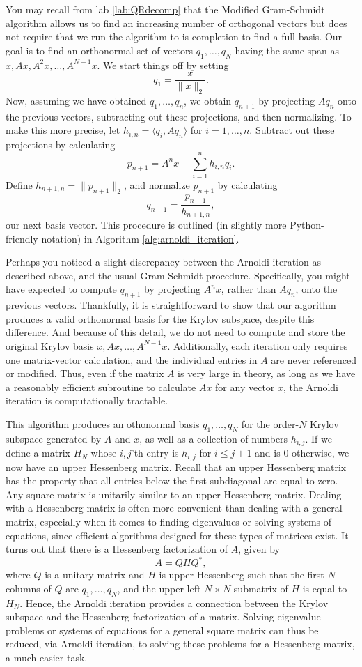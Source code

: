 You may recall from lab \ref{lab:QRdecomp} that the Modified Gram-Schmidt algorithm allows us to find an increasing number of orthogonal
vectors but does not require that we run the algorithm to is completion to find a full basis.
Our goal is to find an orthonormal set of vectors $q_1,\ldots,q_N$ having the same span as $x, Ax, A^2x, \ldots, A^{N-1} x$.
We start
 things off by setting
\[
q_1 = \frac{x}{\|x\|_2}.
\]
Now, assuming we have obtained $q_1,\ldots,q_n$, we obtain $q_{n+1}$ by projecting $A q_n$ onto the previous vectors,
subtracting out these projections, and then normalizing. To make this more precise, let $h_{i,n} = \langle q_i, A q_n\rangle$
for $i = 1,\ldots, n$. Subtract out these projections by calculating
\[
p_{n+1} = A^n x - \sum_{i=1}^n h_{i,n}q_i.
\]
Define $h_{n+1,n} = \|p_{n+1}\|_2$, and normalize $p_{n+1}$ by calculating
\[
q_{n+1} = \frac{p_{n+1}}{h_{n+1,n}},
\]
our next basis vector. This procedure is outlined (in slightly more Python-friendly notation) in Algorithm \ref{alg:arnoldi_iteration}.

Perhaps you noticed a slight discrepancy between the Arnoldi iteration as described above, and the usual Gram-Schmidt procedure.
Specifically, you might have expected to compute $q_{n+1}$ by projecting $A^n x$, rather than $A q_n$, onto the previous vectors. 
Thankfully, it is straightforward to show that our algorithm produces a valid orthonormal basis for the Krylov subspace,
despite this difference. And because of this detail, we do not need to compute and store the original Krylov basis 
$x, Ax, \ldots, A^{N-1}x$.
Additionally, each iteration only requires one matrix-vector calculation, and the individual entries in $A$ are never 
referenced or modified. Thus, even if the matrix $A$ is very large in theory, as long as we have a reasonably efficient 
subroutine to calculate $Ax$ for any vector $x$, the Arnoldi iteration is computationally tractable. 

This algorithm produces an othonormal basis $q_1,\ldots,q_N$ for the order-$N$ Krylov subspace generated by $A$ and $x$, as well
as a collection of numbers $h_{i,j}$. If we define a matrix $H_N$ whose $i,j$'th entry is $h_{i,j}$ for $i \leq j+1$ and
is $0$ otherwise, we now have an upper Hessenberg matrix. 
Recall that an upper Hessenberg matrix has the property that all entries below the first subdiagonal 
are equal to zero. Any square matrix is unitarily similar to an upper Hessenberg matrix. Dealing with a Hessenberg matrix is
often more convenient than dealing with a general matrix, especially when it comes to finding eigenvalues or solving systems
of equations, since efficient algorithms designed for these types of matrices exist. 
It turns out that there is a Hessenberg factorization of $A$, given by
\[
A  = QHQ^*,
\]
where $Q$ is a unitary matrix and $H$ is upper Hessenberg such that the first $N$ columns of $Q$ are $q_1,\ldots,q_N$, and
the upper left $N \times N$ submatrix of $H$ is equal to $H_N$. Hence, the Arnoldi iteration provides a connection between
the Krylov subspace and the Hessenberg factorization of a matrix. Solving eigenvalue problems or systems of equations for
a general square matrix can thus be reduced, via Arnoldi iteration, to solving these problems for a Hessenberg matrix,
a much easier task. 

